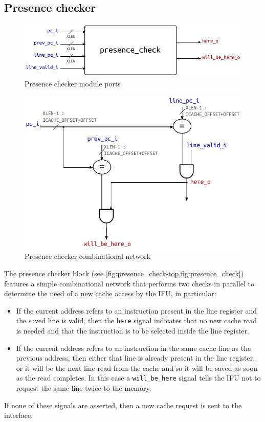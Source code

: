 \subsection{Presence checker}
\begin{figure}[hbt]
  \centering
  \includegraphics{img/presence_check-top.pdf}
  \caption{Presence checker module ports}
  \label{fig:presence_check-top}
\end{figure}
\begin{figure}[hbt]
  \centering
  \includegraphics{img/presence_check.pdf}
  \caption{Presence checker combinational network}
  \label{fig:presence_check}
\end{figure}
The presence checker block (see \cref{fig:presence_check-top,fig:presence_check}) features a simple combinational network that performs two checks in parallel to determine the need of a new cache access by the \ac{IFU}, in particular:
\begin{itemize}
  \item If the current address refers to an instruction present in the line register and the saved line is valid, then the \texttt{here} signal indicates that no new cache read is needed and that the instruction is to be selected inside the line register.
  \item If the current address refers to an instruction in the same cache line as the previous address, then either that line is already present in the line register, or it will be the next line read from the cache and so it will be saved as soon as the read completes. In this case a \texttt{will\_be\_here} signal tells the \ac{IFU} not to request the same line twice to the memory. 
\end{itemize}
If none of these signals are asserted, then a new cache request is sent to the interface.

